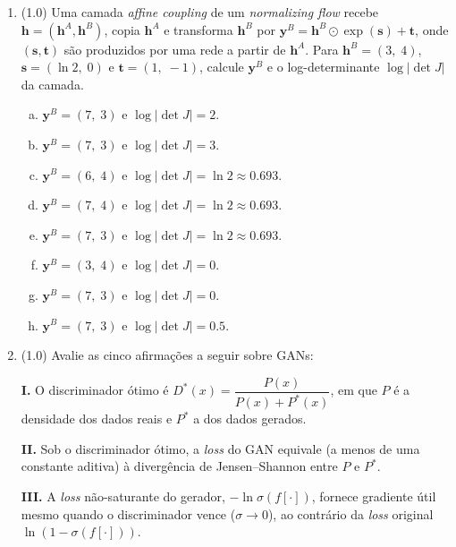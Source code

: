 \documentclass[11pt,a4paper]{article}
\begin{document}
\begin{enumerate}[1)]
\item (1.0) Uma camada \textit{affine coupling} de um \textit{normalizing flow} recebe $\mathbf{h} = (\mathbf{h}^A, \mathbf{h}^B)$, copia $\mathbf{h}^A$ e transforma $\mathbf{h}^B$ por $\mathbf{y}^B = \mathbf{h}^B \odot \exp(\mathbf{s}) + \mathbf{t}$, onde $(\mathbf{s}, \mathbf{t})$ são produzidos por uma rede a partir de $\mathbf{h}^A$. Para $\mathbf{h}^B = (3,\; 4)$, $\mathbf{s} = (\ln 2,\; 0)$ e $\mathbf{t} = (1,\; -1)$, calcule $\mathbf{y}^B$ e o log-determinante $\log\lvert\det J\rvert$ da camada.

\begin{enumerate}[a)]
    \item $\mathbf{y}^B = (7,\; 3)$ \quad e \quad $\log\lvert\det J\rvert = 2$.
    \item $\mathbf{y}^B = (7,\; 3)$ \quad e \quad $\log\lvert\det J\rvert = 3$.
    \item $\mathbf{y}^B = (6,\; 4)$ \quad e \quad $\log\lvert\det J\rvert = \ln 2 \approx 0.693$.
    \item $\mathbf{y}^B = (7,\; 4)$ \quad e \quad $\log\lvert\det J\rvert = \ln 2 \approx 0.693$.
    \item $\mathbf{y}^B = (7,\; 3)$ \quad e \quad $\log\lvert\det J\rvert = \ln 2 \approx 0.693$.
    \item $\mathbf{y}^B = (3,\; 4)$ \quad e \quad $\log\lvert\det J\rvert = 0$.
    \item $\mathbf{y}^B = (7,\; 3)$ \quad e \quad $\log\lvert\det J\rvert = 0$.
    \item $\mathbf{y}^B = (7,\; 3)$ \quad e \quad $\log\lvert\det J\rvert = 0.5$.
\end{enumerate}

\pagebreak

\item (1.0) Avalie as cinco afirmações a seguir sobre GANs:

\textbf{I.} O discriminador ótimo é $D^{*}(x) = \dfrac{P(x)}{P(x) + P^{*}(x)}$, em que $P$ é a densidade dos dados reais e $P^{*}$ a dos dados gerados.

\textbf{II.} Sob o discriminador ótimo, a \emph{loss} do GAN equivale (a menos de uma constante aditiva) à divergência de Jensen--Shannon entre $P$ e $P^{*}$.

\textbf{III.} A \emph{loss} não-saturante do gerador, $-\ln\sigma(f[\cdot])$, fornece gradiente útil mesmo quando o discriminador vence ($\sigma \to 0$), ao contrário da \emph{loss} original $\ln(1 - \sigma(f[\cdot]))$.


\end{enumerate}
\end{document}
